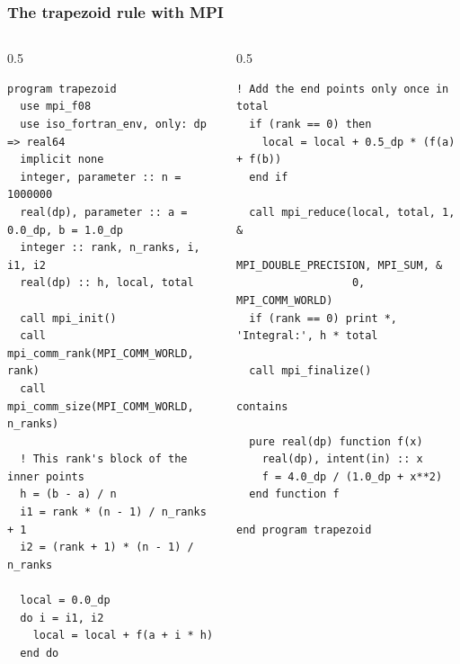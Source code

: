 \begin{frame}[fragile]
  \frametitle{The trapezoid rule with MPI}
  \begin{columns}[T]
    \begin{column}{0.5\textwidth}
\begin{lstlisting}[aboveskip=0pt, belowskip=0pt]
program trapezoid
  use mpi_f08
  use iso_fortran_env, only: dp => real64
  implicit none
  integer, parameter :: n = 1000000
  real(dp), parameter :: a = 0.0_dp, b = 1.0_dp
  integer :: rank, n_ranks, i, i1, i2
  real(dp) :: h, local, total

  call mpi_init()
  call mpi_comm_rank(MPI_COMM_WORLD, rank)
  call mpi_comm_size(MPI_COMM_WORLD, n_ranks)

  ! This rank's block of the inner points
  h = (b - a) / n
  i1 = rank * (n - 1) / n_ranks + 1
  i2 = (rank + 1) * (n - 1) / n_ranks

  local = 0.0_dp
  do i = i1, i2
    local = local + f(a + i * h)
  end do
\end{lstlisting}
    \end{column}

    \begin{column}{0.5\textwidth}
\begin{lstlisting}[aboveskip=0pt, belowskip=0pt]
  ! Add the end points only once in total
  if (rank == 0) then
    local = local + 0.5_dp * (f(a) + f(b))
  end if

  call mpi_reduce(local, total, 1, &
                  MPI_DOUBLE_PRECISION, MPI_SUM, &
                  0, MPI_COMM_WORLD)
  if (rank == 0) print *, 'Integral:', h * total

  call mpi_finalize()

contains

  pure real(dp) function f(x)
    real(dp), intent(in) :: x
    f = 4.0_dp / (1.0_dp + x**2)
  end function f

end program trapezoid
\end{lstlisting}
    \end{column}
  \end{columns}
\end{frame}


